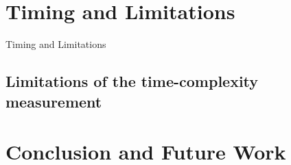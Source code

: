 \documentclass{sig-alternate}
\begin{document}
\section{Timing and Limitations}
Timing and Limitations
\subsection{Limitations of the time-complexity measurement}

\section{Conclusion and Future Work}


{\small

}
\end{document}
